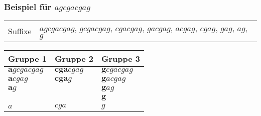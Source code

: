 \documentclass{beamer}
\begin{document}
\begin{frame}
\frametitle{Beispiel für $agcgacgag$}
\begin{tabularx}{\textwidth}{L X}
    Suffixe &  $agcgacgag$, $gcgacgag$, $cgacgag$, $gacgag$, $acgag$, $cgag$, $gag$, $ag$, $g$
\end{tabularx}
\begin{table}
    \begin{tabular}{l l l}
        \toprule
        Gruppe 1                 & Gruppe 2               & Gruppe 3                \\
        \midrule 
        $\boldsymbol{a}gcgacgag$ & $\boldsymbol{cga}cgag$ & $\boldsymbol{g}cgacgag$ \\
        $\boldsymbol{a}cgag$     & $\boldsymbol{cga}g$    & $\boldsymbol{g}acgag$   \\
        $\boldsymbol{a}g$        &                        & $\boldsymbol{g}ag$      \\
                                 &                        & $\boldsymbol{g}$        \\
        \midrule
        $a$                      & $cga$                  & $g$                     \\
        \bottomrule
    \end{tabular}
\end{table}
\end{frame}
\end{document}
